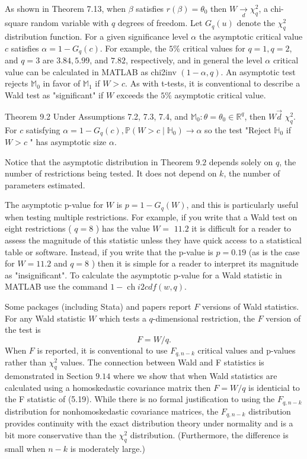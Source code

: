 \documentclass[10pt]{article}
\begin{document}
As shown in Theorem 7.13, when $\beta$ satisfies $r(\beta)=\theta_{0}$ then $W \underset{d}{\rightarrow} \chi_{q}^{2}$, a chi-square random variable with $q$ degrees of freedom. Let $G_{q}(u)$ denote the $\chi_{q}^{2}$ distribution function. For a given significance level $\alpha$ the asymptotic critical value $c$ satisfies $\alpha=1-G_{q}(c)$. For example, the $5 \%$ critical values for $q=1, q=2$, and $q=3$ are $3.84,5.99$, and $7.82$, respectively, and in general the level $\alpha$ critical value can be calculated in MATLAB as chi2inv $(1-\alpha, q)$. An asymptotic test rejects $\mathbb{M}_{0}$ in favor of $\mathbb{M}_{1}$ if $W>c$. As with t-tests, it is conventional to describe a Wald test as "significant" if $W$ exceeds the $5 \%$ asymptotic critical value.

Theorem 9.2 Under Assumptions 7.2, 7.3, 7.4, and $\mathbb{M}_{0}: \theta=\theta_{0} \in \mathbb{R}^{q}$, then $W \vec{d}$ $\chi_{q}^{2}$. For $c$ satisfying $\alpha=1-G_{q}(c), \mathbb{P}\left(W>c \mid \mathbb{H}_{0}\right) \longrightarrow \alpha$ so the test "Reject $\mathbb{H}_{0}$ if $W>c$ " has asymptotic size $\alpha$.

Notice that the asymptotic distribution in Theorem $9.2$ depends solely on $q$, the number of restrictions being tested. It does not depend on $k$, the number of parameters estimated.

The asymptotic p-value for $W$ is $p=1-G_{q}(W)$, and this is particularly useful when testing multiple restrictions. For example, if you write that a Wald test on eight restrictions ( $q=8$ ) has the value $W=$ $11.2$ it is difficult for a reader to assess the magnitude of this statistic unless they have quick access to a statistical table or software. Instead, if you write that the p-value is $p=0.19$ (as is the case for $W=11.2$ and $q=8$ ) then it is simple for a reader to interpret its magnitude as "insignificant". To calculate the asymptotic p-value for a Wald statistic in MATLAB use the command $1-\operatorname{ch} i 2 c d f(w, q)$.

Some packages (including Stata) and papers report $F$ versions of Wald statistics. For any Wald statistic $W$ which tests a $q$-dimensional restriction, the $F$ version of the test is
$$
F=W / q .
$$
When $F$ is reported, it is conventional to use $F_{q, n-k}$ critical values and $\mathrm{p}$-values rather than $\chi_{q}^{2}$ values. The connection between Wald and F statistics is demonstrated in Section $9.14$ where we show that when Wald statistics are calculated using a homoskedastic covariance matrix then $F=W / q$ is identicial to the F statistic of (5.19). While there is no formal justification to using the $F_{q, n-k}$ distribution for nonhomoskedastic covariance matrices, the $F_{q, n-k}$ distribution provides continuity with the exact distribution theory under normality and is a bit more conservative than the $\chi_{q}^{2}$ distribution. (Furthermore, the difference is small when $n-k$ is moderately large.)
\end{document}
